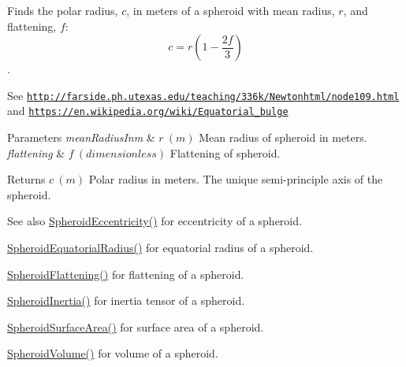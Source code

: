 Finds the polar radius, $c$, in meters of a spheroid with mean radius, $r$, and flattening, $f$\+: \[ c = r \left (1 - \dfrac{2f}{3} \right ) \]. 

See \href{http://farside.ph.utexas.edu/teaching/336k/Newtonhtml/node109.html}{\tt http\+://farside.\+ph.\+utexas.\+edu/teaching/336k/\+Newtonhtml/node109.\+html} and \href{https://en.wikipedia.org/wiki/Equatorial_bulge}{\tt https\+://en.\+wikipedia.\+org/wiki/\+Equatorial\+\_\+bulge} 
\begin{DoxyParams}{Parameters}
{\em mean\+Radius\+Inm} & $ r\ (m)$ Mean radius of spheroid in meters. \\
\hline
{\em flattening} & $ f\ (dimensionless)$ Flattening of spheroid. \\
\hline
\end{DoxyParams}
\begin{DoxyReturn}{Returns}
$ c\ (m)$ Polar radius in meters. The unique semi-\/principle axis of the spheroid. 
\end{DoxyReturn}
\begin{DoxySeeAlso}{See also}
\mbox{\hyperlink{group___e_g_x_math-_geometry-3_d-_spheroid-_eccentricity_gab45680528a41bb7a5e15ddc0059156dd}{Spheroid\+Eccentricity()}} for eccentricity of a spheroid. 

\mbox{\hyperlink{group___e_g_x_math-_geometry-3_d-_spheroid-_equatorial_radius_ga1cbe564fee1b509c622d1c6d276158cd}{Spheroid\+Equatorial\+Radius()}} for equatorial radius of a spheroid. 

\mbox{\hyperlink{group___e_g_x_math-_geometry-3_d-_spheroid-_flattening_ga05e3be91f5f7fbaa9371687aa3834179}{Spheroid\+Flattening()}} for flattening of a spheroid. 

\mbox{\hyperlink{group___e_g_x_math-_geometry-3_d-_spheroid-_inertia_ga4a6085f1b3504bd682ee6818542ae09e}{Spheroid\+Inertia()}} for inertia tensor of a spheroid. 

\mbox{\hyperlink{group___e_g_x_math-_geometry-3_d-_spheroid-_surface_area_ga5a3580e7ded82cb678a558905f41ae49}{Spheroid\+Surface\+Area()}} for surface area of a spheroid. 

\mbox{\hyperlink{group___e_g_x_math-_geometry-3_d-_spheroid-_volume_ga12125484235e94b8f2580f3476b05b92}{Spheroid\+Volume()}} for volume of a spheroid. 
\end{DoxySeeAlso}
